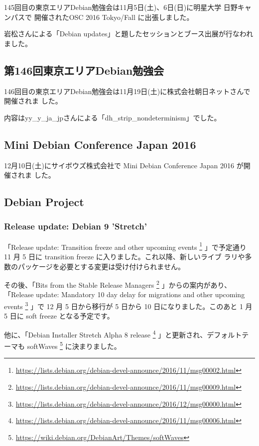 \documentclass[mingoth,a4paper]{jsarticle}
\begin{document}
145回目の東京エリアDebian勉強会は11月5日(土)、6日(日)に明星大学 日野キャンパスで
開催されたOSC 2016 Tokyo/Fall に出張しました。

岩松さんによる「Debian updates」と題したセッションとブース出展が行なわれました。

\subsection{第146回東京エリアDebian勉強会}

146回目の東京エリアDebian勉強会は11月19日(土)に株式会社朝日ネットさんで開催されま
した。

内容はyy\_y\_ja\_jpさんによる「dh\_strip\_nondeterminism」でした。

\subsection{Mini Debian Conference Japan 2016}

12月10日(土)にサイボウズ株式会社で Mini Debian Conference Japan 2016 が開催されま
した。

\subsection{Debian Project}

\subsubsection{Release update: Debian 9 'Stretch'}

「Release update: Transition freeze and other upcoming events
\footnote{\url{https://lists.debian.org/debian-devel-announce/2016/11/msg00002.html}}
」で予定通り 11 月 5 日に transition freeze に入りました。これ以降、新しいライブ
ラリや多数のパッケージを必要とする変更は受け付けられません。

その後、「Bits from the Stable Release Managers
\footnote{\url{https://lists.debian.org/debian-devel-announce/2016/11/msg00009.html}}
」からの案内があり、「Release update: Mandatory 10 day delay for migrations and other
upcoming events
\footnote{\url{https://lists.debian.org/debian-devel-announce/2016/12/msg00000.html}}
」で 12 月 5 日から移行が 5 日から 10 日になりました。このあと 1 月 5 日に soft
freeze となる予定です。

他に、「Debian Installer Stretch Alpha 8 release
\footnote{\url{https://lists.debian.org/debian-devel-announce/2016/11/msg00006.html}}
」と更新され、デフォルトテーマも softWaves
\footnote{\url{https://wiki.debian.org/DebianArt/Themes/softWaves}} に決まりました。
\end{document}
